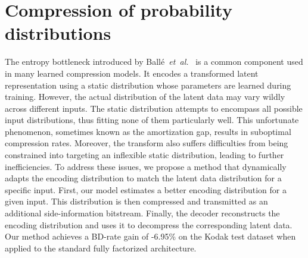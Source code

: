 \chapter{Compression of probability distributions}
\label{ch:pdf_compression}



\begin{chapabstract}
  The entropy bottleneck introduced by Ballé~\emph{et~al.}~\cite{balle2018variational} is a common component used in many learned compression models.
  It encodes a transformed latent representation using a static distribution whose parameters are learned during training.
  However, the actual distribution of the latent data may vary wildly across different inputs.
  The static distribution attempts to encompass all possible input distributions, thus fitting none of them particularly well.
  This unfortunate phenomenon, sometimes known as the amortization gap, results in suboptimal compression rates.
  Moreover, the transform also suffers difficulties from being constrained into targeting an inflexible static distribution, leading to further inefficiencies.
  To address these issues, we propose a method that dynamically adapts the encoding distribution to match the latent data distribution for a specific input.
  First, our model estimates a better encoding distribution for a given input.
  This distribution is then compressed and transmitted as an additional side-information bitstream.
  Finally, the decoder reconstructs the encoding distribution and uses it to decompress the corresponding latent data.
  Our method achieves a BD-rate gain of -6.95\% on the Kodak test dataset when applied to the standard fully factorized architecture.
\end{chapabstract}


